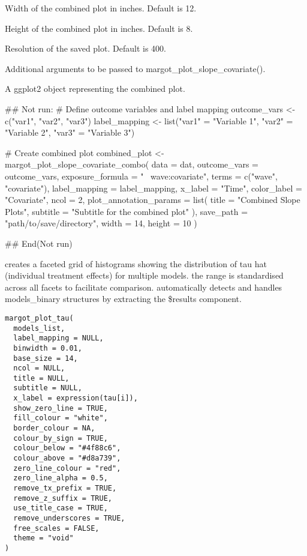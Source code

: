 \documentclass[a4paper]{book}
\begin{document}
\begin{Arguments}
\begin{ldescription}
\item[\code{width}] Width of the combined plot in inches. Default is 12.

\item[\code{height}] Height of the combined plot in inches. Default is 8.

\item[\code{dpi}] Resolution of the saved plot. Default is 400.

\item[\code{...}] Additional arguments to be passed to margot\_plot\_slope\_covariate().
\end{ldescription}
\end{Arguments}
%
\begin{Value}
A ggplot2 object representing the combined plot.
\end{Value}
%
\begin{Examples}
\begin{ExampleCode}
## Not run: 
# Define outcome variables and label mapping
outcome_vars <- c("var1", "var2", "var3")
label_mapping <- list("var1" = "Variable 1", "var2" = "Variable 2", "var3" = "Variable 3")

# Create combined plot
combined_plot <- margot_plot_slope_covariate_combo(
  data = dat,
  outcome_vars = outcome_vars,
  exposure_formula = "~ wave:covariate",
  terms = c("wave", "covariate"),
  label_mapping = label_mapping,
  x_label = "Time",
  color_label = "Covariate",
  ncol = 2,
  plot_annotation_params = list(
    title = "Combined Slope Plots",
    subtitle = "Subtitle for the combined plot"
  ),
  save_path = "path/to/save/directory",
  width = 14,
  height = 10
)

## End(Not run)
\end{ExampleCode}
\end{Examples}
%
\begin{Description}
creates a faceted grid of histograms showing the distribution of tau hat
(individual treatment effects) for multiple models. the range is standardised
across all facets to facilitate comparison. automatically detects and handles
models\_binary structures by extracting the \$results component.
\end{Description}
%
\begin{Usage}
\begin{verbatim}
margot_plot_tau(
  models_list,
  label_mapping = NULL,
  binwidth = 0.01,
  base_size = 14,
  ncol = NULL,
  title = NULL,
  subtitle = NULL,
  x_label = expression(tau[i]),
  show_zero_line = TRUE,
  fill_colour = "white",
  border_colour = NA,
  colour_by_sign = TRUE,
  colour_below = "#4f88c6",
  colour_above = "#d8a739",
  zero_line_colour = "red",
  zero_line_alpha = 0.5,
  remove_tx_prefix = TRUE,
  remove_z_suffix = TRUE,
  use_title_case = TRUE,
  remove_underscores = TRUE,
  free_scales = FALSE,
  theme = "void"
)
\end{verbatim}
\end{Usage}
\end{document}
